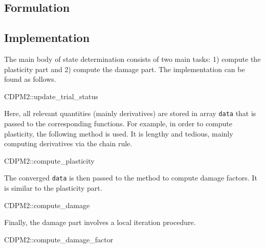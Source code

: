 \subsection{Formulation}
\subsection{Implementation}
The main body of state determination consists of two main tasks: 1) compute the plasticity part and 2) compute the damage part. The implementation can be found as follows.
\begin{cppcode}
CDPM2::update_trial_status
\end{cppcode}

Here, all relevant quantities (mainly derivatives) are stored in array \texttt{data} that is passed to the corresponding functions. For example, in order to compute plasticity, the following method is used. It is lengthy and tedious, mainly computing derivatives via the chain rule.
\begin{cppcode}
CDPM2::compute_plasticity
\end{cppcode}

The converged \texttt{data} is then passed to the method to compute damage factors. It is similar to the plasticity part.
\begin{cppcode}
CDPM2::compute_damage
\end{cppcode}

Finally, the damage part involves a local iteration procedure.
\begin{cppcode}
CDPM2::compute_damage_factor
\end{cppcode}
